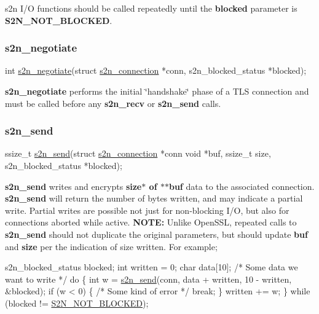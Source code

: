 s2n I/O functions should be called repeatedly until the {\bfseries blocked} parameter is {\bfseries S2\+N\+\_\+\+N\+O\+T\+\_\+\+B\+L\+O\+C\+K\+ED}.

\subsubsection*{s2n\+\_\+negotiate}


\begin{DoxyCode}
\textcolor{keywordtype}{int} \hyperlink{s2n_8h_a309d98d4c1adfd10c5dd62192f4c1051}{s2n\_negotiate}(\textcolor{keyword}{struct} \hyperlink{structs2n__connection}{s2n\_connection} *conn, s2n\_blocked\_status *blocked);
\end{DoxyCode}


{\bfseries s2n\+\_\+negotiate} performs the initial \char`\"{}handshake\char`\"{} phase of a T\+LS connection and must be called before any {\bfseries s2n\+\_\+recv} or {\bfseries s2n\+\_\+send} calls.

\subsubsection*{s2n\+\_\+send}


\begin{DoxyCode}
ssize\_t \hyperlink{s2n_8h_a6d221800840cc73c57109088dac2f467}{s2n\_send}(\textcolor{keyword}{struct} \hyperlink{structs2n__connection}{s2n\_connection} *conn 
              \textcolor{keywordtype}{void} *buf,
              ssize\_t size,
              s2n\_blocked\_status *blocked);
\end{DoxyCode}


{\bfseries s2n\+\_\+send} writes and encrypts {\bfseries size$\ast$ of $\ast$$\ast$buf} data to the associated connection. {\bfseries s2n\+\_\+send} will return the number of bytes written, and may indicate a partial write. Partial writes are possible not just for non-\/blocking I/O, but also for connections aborted while active. {\bfseries N\+O\+TE\+:} Unlike Open\+S\+SL, repeated calls to {\bfseries s2n\+\_\+send} should not duplicate the original parameters, but should update {\bfseries buf} and {\bfseries size} per the indication of size written. For example;


\begin{DoxyCode}
s2n\_blocked\_status blocked;
\textcolor{keywordtype}{int} written = 0;
\textcolor{keywordtype}{char} data[10]; \textcolor{comment}{/* Some data we want to write */}
\textcolor{keywordflow}{do} \{
    \textcolor{keywordtype}{int} w = \hyperlink{s2n_8h_a6d221800840cc73c57109088dac2f467}{s2n\_send}(conn, data + written, 10 - written, &blocked);
    \textcolor{keywordflow}{if} (w < 0) \{
        \textcolor{comment}{/* Some kind of error */}
        \textcolor{keywordflow}{break};
    \}
    written += w;
\} \textcolor{keywordflow}{while} (blocked != \hyperlink{s2n_8h_af70ca0b089daa98cd79a424d3f6af15da7afdc9e789b567fe89c7142f34ec3ebd}{S2N\_NOT\_BLOCKED}); 
\end{DoxyCode}


